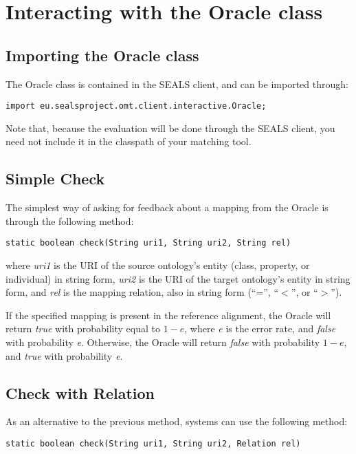 \documentclass{article}
\begin{document}
\section{Interacting with the Oracle class}
\label{sec:oracle}

\subsection{Importing the Oracle class}
\label{sec:import}
The Oracle class is contained in the SEALS client, and can be imported through:
\begin{verbatim}
import eu.sealsproject.omt.client.interactive.Oracle;
\end{verbatim}

Note that, because the evaluation will be done through the SEALS client, you need not include it in the classpath of your matching tool.

\subsection{Simple Check}
\label{sec:simple}
The simplest way of asking for feedback about a mapping from the Oracle is through the following method:
\begin{verbatim}
static boolean check(String uri1, String uri2, String rel)
\end{verbatim}

\noindent
where \textit{uri1} is the URI of the source ontology's entity (class, property, or individual) in string form, \textit{uri2} is the URI of the target ontology's entity in string form, and \textit{rel} is the mapping relation, also in string form (``='', ``\(<\)'', or ``\(>\)'').

If the specified mapping is present in the reference alignment, the Oracle will return \textit{true} with probability equal to \(1-e\), where \textit{e} is the error rate, and \textit{false} with probability \textit{e}. Otherwise, the Oracle will return \textit{false} with probability \(1-e\), and \textit{true} with probability \textit{e}.

\subsection{Check with Relation}
\label{sec:relation}
As an alternative to the previous method, systems can use the following method:
\begin{verbatim}
static boolean check(String uri1, String uri2, Relation rel)
\end{verbatim}
\end{document}
